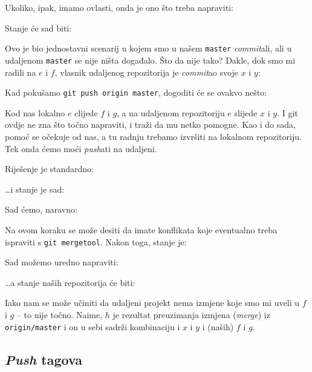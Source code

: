 Ukoliko, ipak, imamo ovlasti, onda je ono što treba napraviti:



Stanje će sad biti:



Ovo je bio jednostavni scenarij u kojem smo u našem \verb+master+ \emph{commit}ali, ali u udaljenom \verb+master+ se nije ništa događalo.
Što da nije tako?
Dakle, dok smo mi radili na $e$ i $f$, vlasnik udaljenog repozitorija je \emph{commit}ao svoje $x$ i $y$:



Kad pokušamo \verb+git push origin master+, dogoditi će se ovakvo nešto:



Kod nas lokalno $e$ clijede $f$ i $g$, a na udaljenom repozitoriju $e$ slijede $x$ i $y$. 
I git ovdje ne zna što točno napraviti, i traži da mu netko pomogne.
Kao i do sada, pomoć se očekuje od nas, a tu radnju trebamo izvršiti na lokalnom repozitoriju.
Tek onda ćemo moći \emph{push}ati na udaljeni.

Riješenje je standardno:


\dots{}i stanje je sad:



Sad ćemo, naravno:


Na ovom koraku se može desiti da imate konflikata koje eventualno treba ispraviti s \verb+git mergetool+.
Nakon toga, stanje je:



Sad možemo uredno napraviti:


\dots{}a stanje naših repozitorija će biti:



Iako nam se može učiniti da udaljeni projekt nema izmjene koje smo mi uveli u $f$ i $g$ -- to nije točno.
Naime, $h$ je rezultat preuzimanja izmjena (\emph{merge}) iz \verb+origin/master+ i on u sebi sadrži kombinaciju i $x$ i $y$ i (naših) $f$ i $g$.

\subsection*{\emph{Push} tagova}


